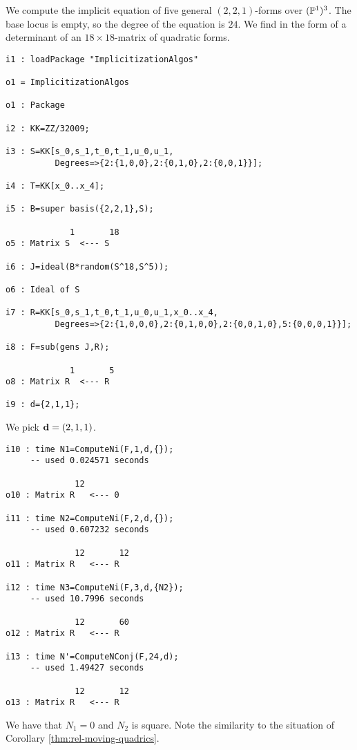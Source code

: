 \documentclass[fleqn,reqno]{amsart}
\numberwithin{first}{chapter}
\begin{document}
\begin{example}[$\mt{ex602}$]
\label{ex602}
We compute the implicit equation of five general $(2,2,1)$-forms over $(\mathbb{P}^1)^3$.
The base locus is empty, so the degree of the equation is $24$.
We find in the form of a determinant of an $18\times18$-matrix of quadratic forms.

\begin{verbatim}
i1 : loadPackage "ImplicitizationAlgos"

o1 = ImplicitizationAlgos

o1 : Package

i2 : KK=ZZ/32009;

i3 : S=KK[s_0,s_1,t_0,t_1,u_0,u_1,
          Degrees=>{2:{1,0,0},2:{0,1,0},2:{0,0,1}}];

i4 : T=KK[x_0..x_4];

i5 : B=super basis({2,2,1},S);

             1       18
o5 : Matrix S  <--- S

i6 : J=ideal(B*random(S^18,S^5));

o6 : Ideal of S

i7 : R=KK[s_0,s_1,t_0,t_1,u_0,u_1,x_0..x_4,
          Degrees=>{2:{1,0,0,0},2:{0,1,0,0},2:{0,0,1,0},5:{0,0,0,1}}];

i8 : F=sub(gens J,R);

             1       5
o8 : Matrix R  <--- R

i9 : d={2,1,1};
\end{verbatim}
We pick $\mathbf d=(2,1,1)$.

\begin{verbatim}
i10 : time N1=ComputeNi(F,1,d,{});
     -- used 0.024571 seconds

              12
o10 : Matrix R   <--- 0

i11 : time N2=ComputeNi(F,2,d,{});
     -- used 0.607232 seconds

              12       12
o11 : Matrix R   <--- R

i12 : time N3=ComputeNi(F,3,d,{N2});
     -- used 10.7996 seconds

              12       60
o12 : Matrix R   <--- R

i13 : time N'=ComputeNConj(F,24,d);
     -- used 1.49427 seconds

              12       12
o13 : Matrix R   <--- R
\end{verbatim}
We have that $N_1=0$ and $N_2$ is square.
Note the similarity to the situation of Corollary \ref{thm:rel-moving-quadrics}.
\end{example}
\end{document}
